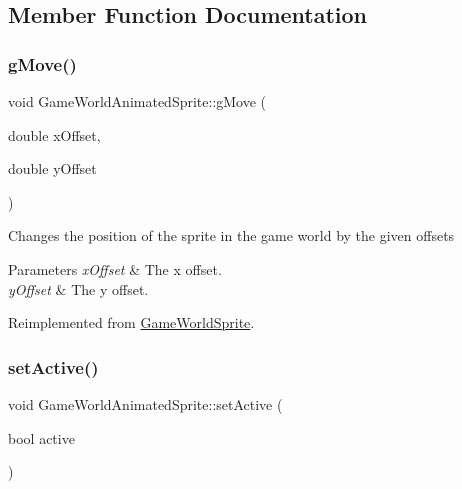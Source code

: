 \subsection{Member Function Documentation}
\mbox{\label{class_game_world_animated_sprite_ac1aa0ef5ec1a3278934238ea214624a4}} 
\subsubsection{\texorpdfstring{g\+Move()}{gMove()}}
{\footnotesize\ttfamily void Game\+World\+Animated\+Sprite\+::g\+Move (\begin{DoxyParamCaption}\item[{double}]{x\+Offset,  }\item[{double}]{y\+Offset }\end{DoxyParamCaption})\hspace{0.3cm}{\ttfamily [virtual]}}



Changes the position of the sprite in the game world by the given offsets 


\begin{DoxyParams}{Parameters}
{\em x\+Offset} & The x offset.\\
\hline
{\em y\+Offset} & The y offset.\\
\hline
\end{DoxyParams}


Reimplemented from \hyperlink{class_game_world_sprite_ad2374a50582a6eb9e4da3cd2115dad08}{Game\+World\+Sprite}.

\mbox{\label{class_game_world_animated_sprite_a625b0d3876fbac51995bf048e94fd7e5}} 
\subsubsection{\texorpdfstring{set\+Active()}{setActive()}}
{\footnotesize\ttfamily void Game\+World\+Animated\+Sprite\+::set\+Active (\begin{DoxyParamCaption}\item[{bool}]{active }\end{DoxyParamCaption})\hspace{0.3cm}{\ttfamily [virtual]}}




